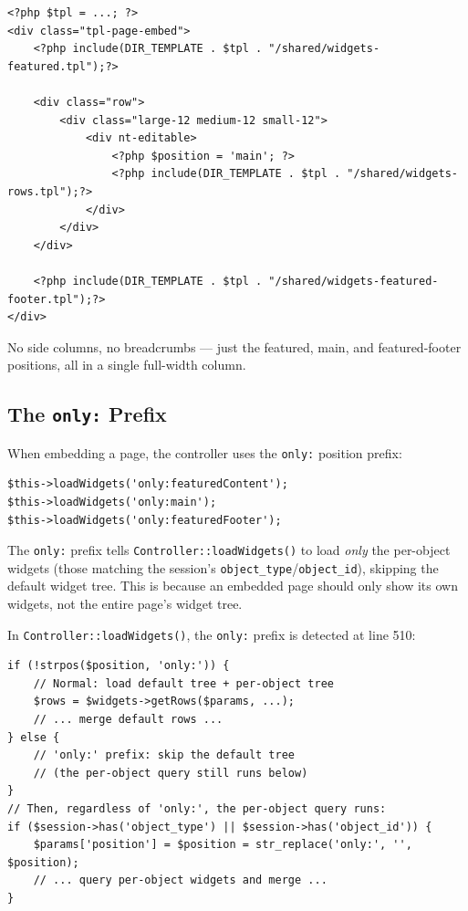 \documentclass[11pt,a4paper]{article}
\begin{document}
\begin{lstlisting}[caption={\texttt{page\_embed.tpl} --- the simplified embed layout.},label={lst:page-embed}]
<?php $tpl = ...; ?>
<div class="tpl-page-embed">
    <?php include(DIR_TEMPLATE . $tpl . "/shared/widgets-featured.tpl");?>

    <div class="row">
        <div class="large-12 medium-12 small-12">
            <div nt-editable>
                <?php $position = 'main'; ?>
                <?php include(DIR_TEMPLATE . $tpl . "/shared/widgets-rows.tpl");?>
            </div>
        </div>
    </div>

    <?php include(DIR_TEMPLATE . $tpl . "/shared/widgets-featured-footer.tpl");?>
</div>
\end{lstlisting}

No side columns, no breadcrumbs --- just the featured, main, and
featured-footer positions, all in a single full-width column.

\subsection{The \texttt{only:} Prefix}

When embedding a page, the controller uses the \texttt{only:} position
prefix:

\begin{lstlisting}[caption={The \texttt{only:} prefix in \texttt{ControllerContentPage::embed()}.},label={lst:only-prefix}]
$this->loadWidgets('only:featuredContent');
$this->loadWidgets('only:main');
$this->loadWidgets('only:featuredFooter');
\end{lstlisting}

The \texttt{only:} prefix tells \texttt{Controller::loadWidgets()} to
load \emph{only} the per-object widgets (those matching the session's
\texttt{object\_type}/\texttt{object\_id}), skipping the default widget
tree. This is because an embedded page should only show its own widgets,
not the entire page's widget tree.

In \texttt{Controller::loadWidgets()}, the \texttt{only:} prefix is
detected at line 510:

\begin{lstlisting}[caption={\texttt{Controller::loadWidgets()} --- the \texttt{only:} detection.},label={lst:only-detection}]
if (!strpos($position, 'only:')) {
    // Normal: load default tree + per-object tree
    $rows = $widgets->getRows($params, ...);
    // ... merge default rows ...
} else {
    // 'only:' prefix: skip the default tree
    // (the per-object query still runs below)
}
// Then, regardless of 'only:', the per-object query runs:
if ($session->has('object_type') || $session->has('object_id')) {
    $params['position'] = $position = str_replace('only:', '', $position);
    // ... query per-object widgets and merge ...
}
\end{lstlisting}
\end{document}

